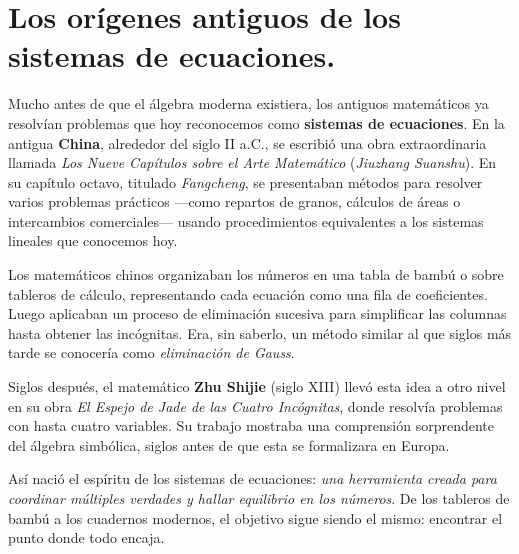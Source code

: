 
\vspace{0.5cm}

\vspace{1em}
\section*{Los orígenes antiguos de los sistemas de ecuaciones.}

\begin{reseñaplana}
Mucho antes de que el álgebra moderna existiera, los antiguos matemáticos ya resolvían problemas 
que hoy reconocemos como \textbf{sistemas de ecuaciones}.  
En la antigua \textbf{China}, alrededor del siglo II a.C., se escribió una obra extraordinaria 
llamada \textit{Los Nueve Capítulos sobre el Arte Matemático} (\textit{Jiuzhang Suanshu}). En su 
capítulo octavo, titulado \textit{Fangcheng}, se presentaban métodos para resolver varios problemas 
prácticos —como repartos de granos, cálculos de áreas o intercambios comerciales— usando procedimientos 
equivalentes a los sistemas lineales que conocemos hoy.

Los matemáticos chinos organizaban los números en una tabla de bambú o sobre tableros de cálculo, representando 
cada ecuación como una fila de coeficientes. Luego aplicaban un proceso de eliminación sucesiva para simplificar 
las columnas hasta obtener las incógnitas. Era, sin saberlo, un método similar al que siglos más tarde se 
conocería como \textit{eliminación de Gauss}.  

Siglos después, el matemático \textbf{Zhu Shijie} (siglo XIII) llevó esta idea a otro nivel en su 
obra \textit{El Espejo de Jade de las Cuatro Incógnitas}, donde resolvía problemas con hasta cuatro variables. Su trabajo 
mostraba una comprensión sorprendente del álgebra simbólica, siglos antes de que esta se formalizara en Europa.

Así nació el espíritu de los sistemas de ecuaciones: \textit{una herramienta creada para coordinar múltiples verdades 
y hallar equilibrio en los números}. De los tableros de bambú a los cuadernos modernos, el objetivo sigue siendo el 
mismo: encontrar el punto donde todo encaja.
\end{reseñaplana}


